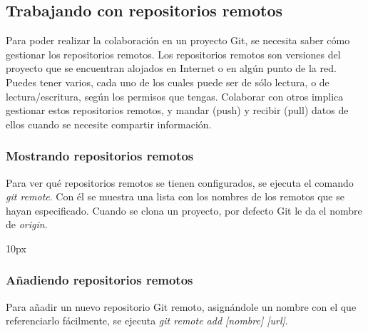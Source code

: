 %
%
\subsection{Trabajando con repositorios remotos}

Para poder realizar la colaboración en un proyecto Git, se necesita saber cómo gestionar los repositorios remotos. Los repositorios remotos son versiones del proyecto que se encuentran alojados en Internet o en algún punto de la red. Puedes tener varios, cada uno de los cuales puede ser de sólo lectura, o de lectura/escritura, según los permisos que tengas. Colaborar con otros implica gestionar estos repositorios remotos, y mandar (push) y recibir (pull) datos de ellos cuando se necesite compartir información.

\subsubsection{Mostrando repositorios remotos}
Para ver qué repositorios remotos se tienen configurados, se ejecuta el comando {\it git remote}. Con él se muestra una lista con los nombres de los remotos que se hayan especificado. Cuando se clona un proyecto, por defecto Git le da el nombre de {\it origin}.

\begin{center}{
	\fboxsep 10px
	}
\end{center}

\subsubsection{Añadiendo repositorios remotos}

Para añadir un nuevo repositorio Git remoto, asignándole un nombre con el que referenciarlo fácilmente, se ejecuta {\it git remote add [nombre] [url]}.

